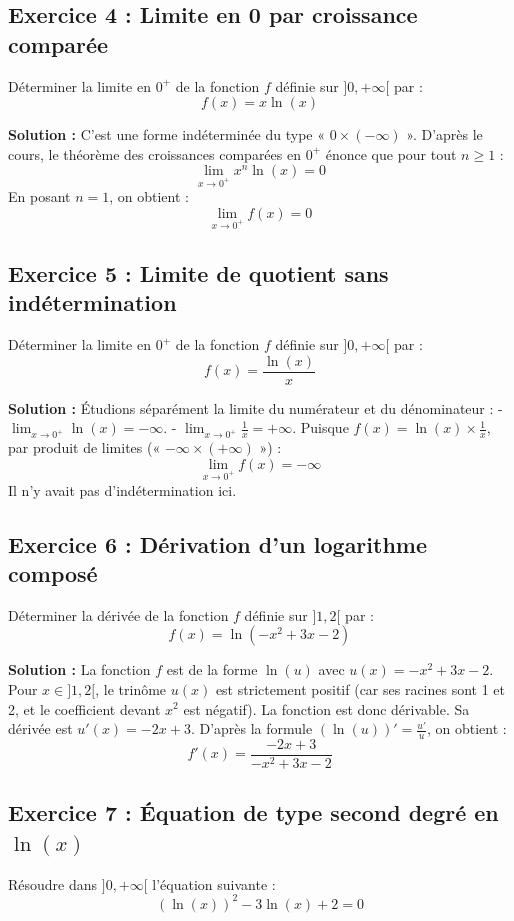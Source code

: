 \subsection*{Exercice 4 : Limite en 0 par croissance comparée}
Déterminer la limite en $0^+$ de la fonction $f$ définie sur $]0, +\infty[$ par :
\[
f(x) = x \ln(x)
\]

\textbf{Solution :}
C'est une forme indéterminée du type « $0 \times (-\infty)$ ».
D'après le cours, le théorème des croissances comparées en $0^+$ énonce que pour tout $n \ge 1$ :
\[
\lim_{x \to 0^+} x^n \ln(x) = 0
\]
En posant $n = 1$, on obtient :
\[
\lim_{x \to 0^+} f(x) = 0
\]

\subsection*{Exercice 5 : Limite de quotient sans indétermination}
Déterminer la limite en $0^+$ de la fonction $f$ définie sur $]0, +\infty[$ par :
\[
f(x) = \frac{\ln(x)}{x}
\]

\textbf{Solution :}
Étudions séparément la limite du numérateur et du dénominateur :
- $\lim_{x \to 0^+} \ln(x) = -\infty$.
- $\lim_{x \to 0^+} \frac{1}{x} = +\infty$.
Puisque $f(x) = \ln(x) \times \frac{1}{x}$, par produit de limites (« $-\infty \times (+\infty)$ ») :
\[
\lim_{x \to 0^+} f(x) = -\infty
\]
Il n'y avait pas d'indétermination ici.

\subsection*{Exercice 6 : Dérivation d'un logarithme composé}
Déterminer la dérivée de la fonction $f$ définie sur $]1, 2[$ par :
\[
f(x) = \ln(-x^2 + 3x - 2)
\]

\textbf{Solution :}
La fonction $f$ est de la forme $\ln(u)$ avec $u(x) = -x^2 + 3x - 2$.
Pour $x \in ]1, 2[$, le trinôme $u(x)$ est strictement positif (car ses racines sont 1 et 2, et le coefficient devant $x^2$ est négatif). La fonction est donc dérivable.
Sa dérivée est $u'(x) = -2x + 3$.
D'après la formule $(\ln(u))' = \frac{u'}{u}$, on obtient :
\[
f'(x) = \frac{-2x + 3}{-x^2 + 3x - 2}
\]

\subsection*{Exercice 7 : Équation de type second degré en $\ln(x)$}
Résoudre dans $]0, +\infty[$ l'équation suivante :
\[
(\ln(x))^2 - 3\ln(x) + 2 = 0
\]

